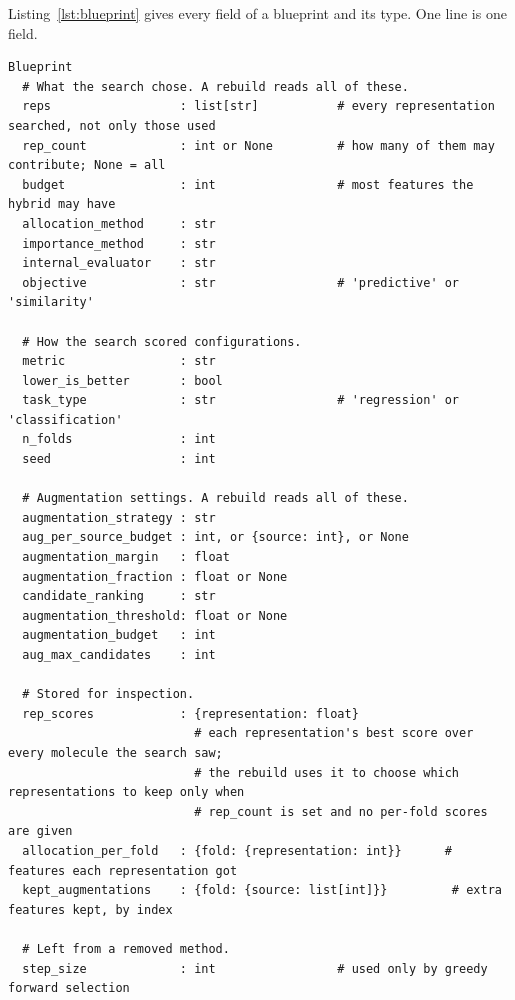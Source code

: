 Listing~\ref{lst:blueprint} gives every field of a blueprint and its type. One line is one field.
\begin{lstlisting}[float=htbp, breaklines=true, basicstyle=\scriptsize\ttfamily, columns=fullflexible, keepspaces=true, frame=single, caption={The fields of a blueprint.}, label=lst:blueprint, captionpos=b]
Blueprint
  # What the search chose. A rebuild reads all of these.
  reps                  : list[str]           # every representation searched, not only those used
  rep_count             : int or None         # how many of them may contribute; None = all
  budget                : int                 # most features the hybrid may have
  allocation_method     : str
  importance_method     : str
  internal_evaluator    : str
  objective             : str                 # 'predictive' or 'similarity'

  # How the search scored configurations.
  metric                : str
  lower_is_better       : bool
  task_type             : str                 # 'regression' or 'classification'
  n_folds               : int
  seed                  : int

  # Augmentation settings. A rebuild reads all of these.
  augmentation_strategy : str
  aug_per_source_budget : int, or {source: int}, or None
  augmentation_margin   : float
  augmentation_fraction : float or None
  candidate_ranking     : str
  augmentation_threshold: float or None
  augmentation_budget   : int
  aug_max_candidates    : int

  # Stored for inspection.
  rep_scores            : {representation: float}
                          # each representation's best score over every molecule the search saw;
                          # the rebuild uses it to choose which representations to keep only when
                          # rep_count is set and no per-fold scores are given
  allocation_per_fold   : {fold: {representation: int}}      # features each representation got
  kept_augmentations    : {fold: {source: list[int]}}         # extra features kept, by index

  # Left from a removed method.
  step_size             : int                 # used only by greedy forward selection
\end{lstlisting}


